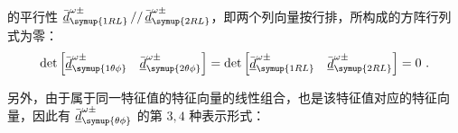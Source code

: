 的平行性 $\bar{\underline{d}}^{\omega\pm}_{\symup{1RL}} \mathop{//} \bar{\underline{d}}^{\omega\pm}_{\symup{2RL}}$，即两个列向量按行排，所构成的方阵行列式为零：
\begin{equation} \label{eq:2-67}
	\belowdisplayskip=16pt
	\det \left[ \begin{matrix} \bar{\underline{d}}^{\omega\pm}_{\symup{1\theta\phi}} & \bar{\underline{d}}^{\omega\pm}_{\symup{2\theta\phi}} \end{matrix} \right] = \det \left[ \begin{matrix} \bar{\underline{d}}^{\omega\pm}_{\symup{1RL}} & \bar{\underline{d}}^{\omega\pm}_{\symup{2RL}} \end{matrix} \right] = 0 ~.
\end{equation}

另外，由于属于同一特征值的特征向量的线性组合，也是该特征值对应的特征向量，因此有 $\bar{\underline{d}}^{\omega\pm}_{\symup{\theta\phi}}$ 的第 $3, 4$ 种表示形式：
